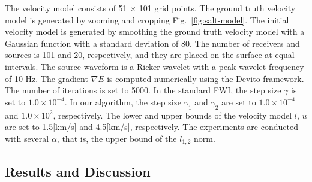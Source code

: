 The velocity model consists of 51 $\times$ 101 grid points.
The ground truth velocity model is generated by zooming and cropping Fig.~\ref{fig:salt-model}.
The initial velocity model is generated by smoothing the ground truth velocity model with a Gaussian function with a standard deviation of 80.
The number of receivers and sources is 101 and 20, respectively, and they are placed on the surface at equal intervals.
The source waveform is a Ricker wavelet with a peak wavelet frequency of 10 Hz.
The gradient $\nabla E$ is computed numerically using the Devito framework\cite{devito}.
The number of iterations is set to 5000.
In the standard FWI, the step size $\gamma$ is set to $1.0 \times 10^{-4}$.
In our algorithm, the step size $\gamma_1$ and $\gamma_2$ are set to $1.0 \times 10^{-4}$ and $1.0 \times 10^2$, respectively.
The lower and upper bounds of the velocity model $l$, $u$ are set to 1.5[km/s] and 4.5[km/s], respectively.
The experiments are conducted with several $\alpha$, that is, the upper bound of the $l_{1,2}$ norm.


\subsection{Results and Discussion}\label{subsec:results-and-discussion}


